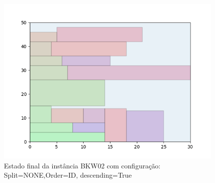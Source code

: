 \begin{figure}[H]
    \centering
    \caption[]{Estado final da instância BKW02 com configuração: Split=NONE,Order=ID, descending=True}
    \label{fig:bkw02-none-id-true}
    \includegraphics[scale=0.5]{output/figures/bkw/bkw02/none/id/true/00}
\end{figure}